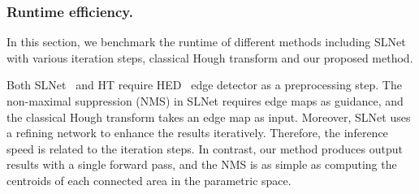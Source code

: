 \documentclass[10pt,journal,cspaper,compsoc]{IEEEtran}
\newcommand{\revise}[1]{{\textcolor{black}{#1}}}
\newcommand{\CheckRmv}[1]{}
\newcommand{\CheckRmv}[1]{#1}
\begin{document}

\CheckRmv{
\begin{figure*}[tb!]
  \begin{center}
  \begin{overpic}[width=1.0 \linewidth]{figures/sl6500_results.pdf}
  \end{overpic}
  \end{center}
  \vspace{-12pt}
  \caption{
    Detection results of our method on the \revise{NKL} dataset.
    Our method produces results that are visually compatible with human perception.
  }
  \label{fig:detections-NKL}
\end{figure*}
}

\subsubsection{Runtime efficiency.}
In this section, we benchmark the runtime of different methods including SLNet~\cite{lee2017semantic}
with various iteration steps, classical Hough transform and our proposed method.

Both SLNet~\cite{lee2017semantic} and HT require HED~\cite{xie2015holistically}
edge detector as a preprocessing step.
%
The non-maximal suppression (NMS) in SLNet requires edge maps as guidance,
%
and the classical Hough transform takes an edge map as input.
%
Moreover, SLNet uses a refining network to enhance the results iteratively.
Therefore, the inference speed is related to the iteration  steps.
%
In contrast, our method produces output results with a single forward pass,
and the NMS is as simple as computing the centroids of each connected area
in the parametric space.
\end{document}

